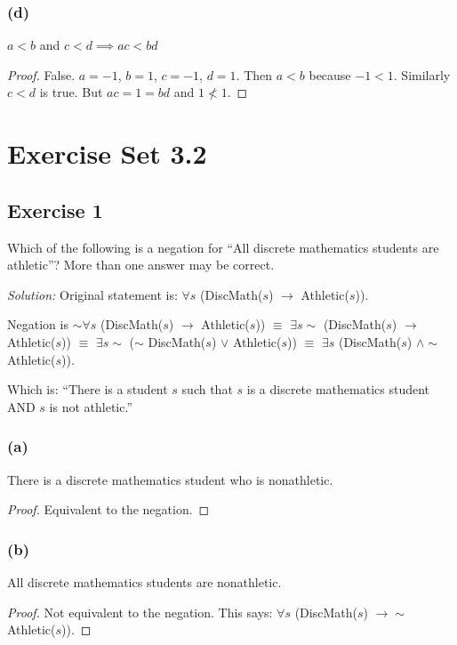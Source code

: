 \documentclass[14pt]{extarticle}
\newcommand{\fa}{\forall}
\newcommand{\te}{\exists}
\begin{document}
\subsubsection{(d)}
$a < b$ and $c < d \implies ac < bd$

\begin{proof}
False. $a = -1$, $b = 1$, $c = -1$, $d = 1$. Then $a < b$ because $-1 < 1$. Similarly $c < d$ is true. But $ac = 1 = bd$ and $1 \nless 1$.
\end{proof}

\section{Exercise Set 3.2}

\subsection{Exercise 1}
Which of the following is a negation for “All discrete mathematics students are athletic”? More than one answer may be correct.

{\it Solution:} Original statement is: $\fa s$ (DiscMath($s$) $\to$ Athletic($s$)). 

Negation is $\sim \fa s$ (DiscMath($s$) $\to$ Athletic($s$)) $\equiv$ $\te s \sim$ (DiscMath($s$) $\to$ Athletic($s$)) $\equiv$ $\te s \sim$ ($\sim$ DiscMath($s$) $\vee$ Athletic($s$)) $\equiv$ $\te s$ (DiscMath($s$) $\wedge \sim$ Athletic($s$)).

Which is: ``There is a student $s$ such that $s$ is a discrete mathematics student AND $s$ is not athletic.''

\subsubsection{(a)}
There is a discrete mathematics student who is nonathletic.

\begin{proof}
Equivalent to the negation.
\end{proof}

\subsubsection{(b)}
All discrete mathematics students are nonathletic.

\begin{proof}
Not equivalent to the negation. This says: $\fa s$ (DiscMath($s$) $\to\sim$ Athletic($s$)).
\end{proof}
\end{document}
